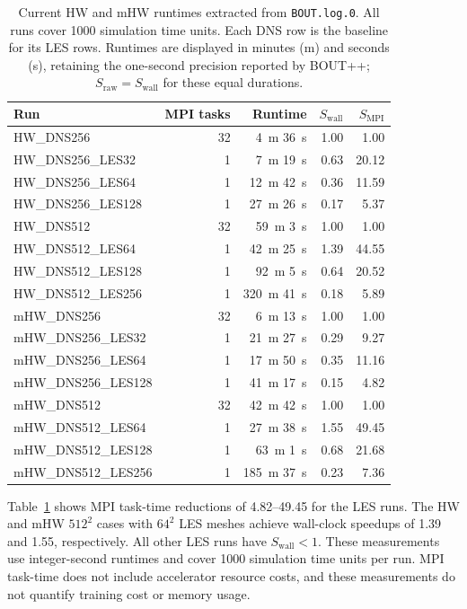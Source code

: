 \documentclass[authoryear,preprint,review,12pt]{elsarticle}
\begin{document}
\begin{table}[ht]
\centering
\small
\caption{Current HW and mHW runtimes extracted from \texttt{BOUT.log.0}. All runs cover 1000 simulation time units. Each DNS row is the baseline for its LES rows. Runtimes are displayed in minutes (m) and seconds (s), retaining the one-second precision reported by BOUT++; $S_{\mathrm{raw}}=S_{\mathrm{wall}}$ for these equal durations.}
\label{tab:performance}
\begin{tabular}{lrrrr}
\toprule
Run & MPI tasks & Runtime & $S_{\mathrm{wall}}$ & $S_{\mathrm{MPI}}$ \\
\midrule
HW\_DNS256 & 32 & 4~m 36~s & 1.00 & 1.00 \\
HW\_DNS256\_LES32 & 1 & 7~m 19~s & 0.63 & 20.12 \\
HW\_DNS256\_LES64 & 1 & 12~m 42~s & 0.36 & 11.59 \\
HW\_DNS256\_LES128 & 1 & 27~m 26~s & 0.17 & 5.37 \\
\midrule
HW\_DNS512 & 32 & 59~m 3~s & 1.00 & 1.00 \\
HW\_DNS512\_LES64 & 1 & 42~m 25~s & 1.39 & 44.55 \\
HW\_DNS512\_LES128 & 1 & 92~m 5~s & 0.64 & 20.52 \\
HW\_DNS512\_LES256 & 1 & 320~m 41~s & 0.18 & 5.89 \\
\midrule
mHW\_DNS256 & 32 & 6~m 13~s & 1.00 & 1.00 \\
mHW\_DNS256\_LES32 & 1 & 21~m 27~s & 0.29 & 9.27 \\
mHW\_DNS256\_LES64 & 1 & 17~m 50~s & 0.35 & 11.16 \\
mHW\_DNS256\_LES128 & 1 & 41~m 17~s & 0.15 & 4.82 \\
\midrule
mHW\_DNS512 & 32 & 42~m 42~s & 1.00 & 1.00 \\
mHW\_DNS512\_LES64 & 1 & 27~m 38~s & 1.55 & 49.45 \\
mHW\_DNS512\_LES128 & 1 & 63~m 1~s & 0.68 & 21.68 \\
mHW\_DNS512\_LES256 & 1 & 185~m 37~s & 0.23 & 7.36 \\
\bottomrule
\end{tabular}
\end{table}

Table~\ref{tab:performance} shows MPI task-time reductions of 4.82--49.45 for the LES runs. The HW and mHW $512^2$ cases with $64^2$ LES meshes achieve wall-clock speedups of 1.39 and 1.55, respectively. All other LES runs have $S_{\mathrm{wall}}<1$. These measurements use integer-second runtimes and cover 1000 simulation time units per run. MPI task-time does not include accelerator resource costs, and these measurements do not quantify training cost or memory usage.
\end{document}

